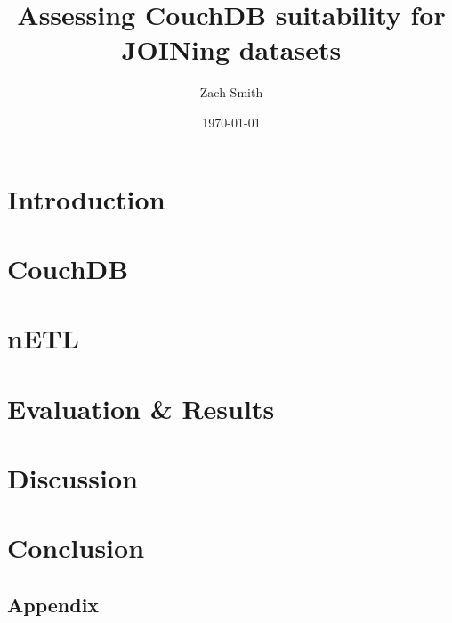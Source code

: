 \documentclass[
    parskip=full,
    a4paper
]{scrartcl}
\title{Assessing CouchDB suitability for JOINing datasets} %
\author{Zach Smith}
\date{\today}
\begin{document}
\maketitle
\thispagestyle{empty}


\newpage

\tableofcontents
\newpage

\section{Introduction}




\section{CouchDB}



\section{nETL}




\section{Evaluation \& Results}




\section{Discussion}



\section{Conclusion}


\newpage

\begin{appendix}
    \section{Appendix}
    
    
    
    
    \listoffigures
    \listoftables
\end{appendix}
\newpage




\end{document}
